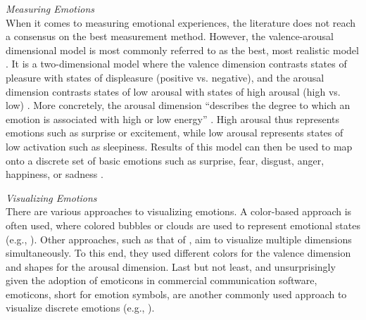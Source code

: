 \medskip\noindent\textit{Measuring Emotions}\\
When it comes to measuring emotional experiences, the literature does not reach a consensus on the best measurement method. However, the valence-arousal dimensional model is most commonly referred to as the best, most realistic model \autocite{russell1980circumplex, mauss2009measures}. It is a two-dimensional model where the valence dimension contrasts states of pleasure with states of displeasure (positive vs. negative), and the arousal dimension contrasts states of low arousal with states of high arousal (high vs. low) \autocite{mauss2009measures}. More concretely, the arousal dimension \enquote{describes the degree to which an emotion is associated with high or low energy} \autocite[p.~1334]{tseng2014using}. High arousal thus represents emotions such as surprise or excitement, while low arousal represents states of low activation such as sleepiness. Results of this model can then be used to map onto a discrete set of basic emotions such as surprise, fear, disgust, anger, happiness, or sadness \autocite{brave2007emotion}.

\medskip\noindent\textit{Visualizing Emotions}\\
There are various approaches to visualizing emotions. A color-based approach is often used, where colored bubbles or clouds are used to represent emotional states (e.g., \autocite{church2010study, kempter2014emotionwatch, guzman2013visualizing}). Other approaches, such as that of \textcite{mcduff2012affectaura}, aim to visualize multiple dimensions simultaneously. To this end, they used different colors for the valence dimension and shapes for the arousal dimension. Last but not least, and unsurprisingly given the adoption of emoticons in commercial communication software, emoticons, short for emotion symbols, are another commonly used approach to visualize discrete emotions (e.g., \autocite{garcia1999emotional, sanchez2006conveying}).